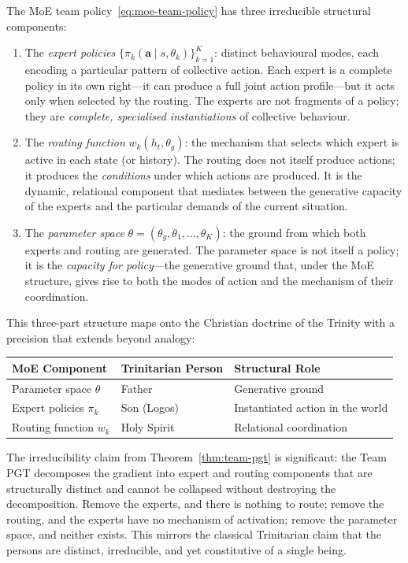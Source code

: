 The MoE team policy~\eqref{eq:moe-team-policy} has three irreducible structural components:
\begin{enumerate}[label=(\roman*)]
  \item The \emph{expert policies} $\{\pi_k(\bm{a}\mid s,\theta_k)\}_{k=1}^K$: distinct behavioural modes, each encoding a particular pattern of collective action. Each expert is a complete policy in its own right---it can produce a full joint action profile---but it acts only when selected by the routing. The experts are not fragments of a policy; they are \emph{complete, specialised instantiations} of collective behaviour.
  \item The \emph{routing function} $w_k(h_t,\theta_g)$: the mechanism that selects which expert is active in each state (or history). The routing does not itself produce actions; it produces the \emph{conditions} under which actions are produced. It is the dynamic, relational component that mediates between the generative capacity of the experts and the particular demands of the current situation.
  \item The \emph{parameter space} $\theta = (\theta_g, \theta_1, \ldots, \theta_K)$: the ground from which both experts and routing are generated. The parameter space is not itself a policy; it is the \emph{capacity for policy}---the generative ground that, under the MoE structure, gives rise to both the modes of action and the mechanism of their coordination.
\end{enumerate}

This three-part structure maps onto the Christian doctrine of the Trinity with a precision that extends beyond analogy:

\begin{center}
\begin{tabular}{lll}
\textbf{MoE Component} & \textbf{Trinitarian Person} & \textbf{Structural Role} \\
\hline
Parameter space $\theta$ & Father & Generative ground \\
Expert policies $\pi_k$ & Son (Logos) & Instantiated action in the world \\
Routing function $w_k$ & Holy Spirit & Relational coordination \\
\end{tabular}
\end{center}

The irreducibility claim from Theorem~\ref{thm:team-pgt} is significant: the Team PGT decomposes the gradient into expert and routing components that are structurally distinct and cannot be collapsed without destroying the decomposition. Remove the experts, and there is nothing to route; remove the routing, and the experts have no mechanism of activation; remove the parameter space, and neither exists. This mirrors the classical Trinitarian claim that the persons are distinct, irreducible, and yet constitutive of a single being.

